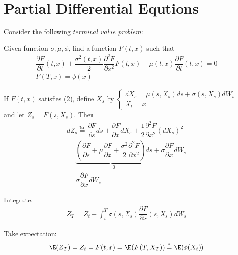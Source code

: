 \section{Partial Differential Equtions}
Consider the following \textit{terminal value problem}:\par
\noindent Given function $\sigma,\mu,\phi$, find a function $F(t,x)$ such that 
\begin{equation}
  \begin{gathered}
    \dfrac{\partial F}{\partial t}(t,x)+\dfrac{\sigma^2(t,x)}{2}\dfrac{\partial^2 F}{\partial x^2}F(t,x)+\mu(t,x)\dfrac{\partial F}{\partial t}(t,x) = 0\\
    F(T,x) = \phi(x)
  \end{gathered}
\end{equation}\par
\noindent If $F(t,x)$ satisfies (2), define $X_s$ by $\begin{cases}
  dX_s = \mu(s,X_s)ds+\sigma(s,X_s)dW_s\\X_t=x
\end{cases}$ and let $Z_s = F(s,X_s)$. Then
\begin{equation*}
  \begin{gathered}
    dZ_s \stackrel{\text{Ito}}{=}\dfrac{\partial F}{\partial s}ds+\dfrac{\partial F}{\partial x}dX_s+\dfrac{1}{2}\dfrac{\partial^2 F}{\partial x^2}(dX_s)^2\\
    = \underbrace{\left(\dfrac{\partial F}{\partial s}+\mu\dfrac{\partial F}{\partial x}+\dfrac{\sigma^2}{2}\dfrac{\partial^2 F}{\partial x^2}\right)}_{=0}ds + \sigma\dfrac{\partial F}{\partial x}dW_s\\
    = \sigma\dfrac{\partial F}{\partial x}dW_s
  \end{gathered}
\end{equation*}\par
\noindent Integrate:
\begin{equation*}
  \begin{gathered}
    Z_T = Z_t + \int_{t}^{T}\sigma(s,X_s)\dfrac{\partial F}{\partial x}(s,X_s)dW_s
  \end{gathered}
\end{equation*}\par
\noindent Take expectation:
\begin{equation*}
  \begin{gathered}
    \E(Z_T) = Z_t = F(t,x) = \E(F(T,X_T)) \stackrel{*}{=} \E(\phi(X_t))
  \end{gathered}
\end{equation*}\par
